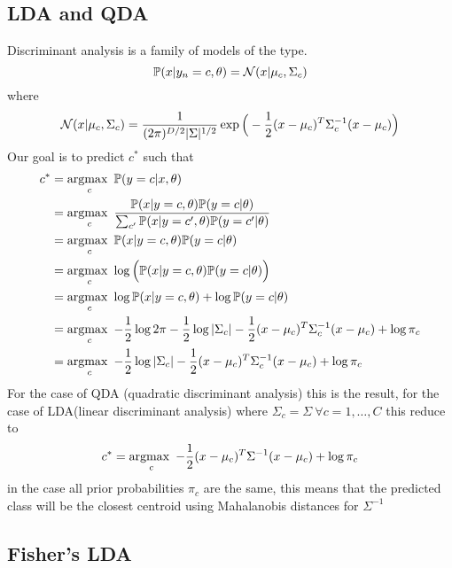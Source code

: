 \documentclass[../main.tex]{subfiles}
\begin{document}
\subsection{LDA and QDA}
Discriminant analysis is a family of models of the type.
\begin{equation*}
    \mathbb{P}(x | y_n=c, \theta) = \mathcal{N}(x|\mu_c, \Sigma_c)
\end{equation*}
where
\begin{equation*}
    \mathcal{N}(x|\mu_c, \Sigma_c) = \dfrac{1}{(2\pi)^{D/2} |\Sigma|^{1/2}} \exp\Big(-\frac{1}{2} (x-\mu_c)^T \Sigma_c^{-1} (x-\mu_c)\Big)
\end{equation*}
Our goal is to predict $c^*$ such that
\begin{align*}
    c^*
    &= \operatorname*{argmax\text{ }}_c \mathbb{P}(y=c|x,\theta)\\
    &= \operatorname*{argmax\text{ }}_c \dfrac{\mathbb{P}(x|y=c,\theta)\mathbb{P}(y=c|\theta)}{\sum_{c'}\mathbb{P}(x|y=c',\theta)\mathbb{P}(y=c'|\theta)}\\
    &= \operatorname*{argmax\text{ }}_c \mathbb{P}(x|y=c,\theta)\mathbb{P}(y=c|\theta)\\
    &= \operatorname*{argmax\text{ }}_c \log\Big(\mathbb{P}(x|y=c,\theta)\mathbb{P}(y=c|\theta)\Big)\\
    &= \operatorname*{argmax\text{ }}_c \log\mathbb{P}(x|y=c,\theta) + \log\mathbb{P}(y=c|\theta)\\
    &= \operatorname*{argmax\text{ }}_c -\frac{1}{2}\log2\pi -\frac{1}{2}\log|\Sigma_c| -\frac{1}{2} (x-\mu_c)^T \Sigma_c^{-1} (x-\mu_c) + \log\pi_c\\
    &= \operatorname*{argmax\text{ }}_c -\frac{1}{2}\log|\Sigma_c| -\frac{1}{2} (x-\mu_c)^T \Sigma_c^{-1} (x-\mu_c) + \log\pi_c\\
\end{align*}
For the case of QDA (quadratic discriminant analysis) this is the result, for the case of LDA(linear discriminant analysis) where $\Sigma_c = \Sigma\ \forall c=1,\dots,C$ this reduce to
\begin{align*}
    c^*
    &= \operatorname*{argmax\text{ }}_c -\frac{1}{2} (x-\mu_c)^T \Sigma^{-1} (x-\mu_c) + \log\pi_c\\
\end{align*}
in the case all prior probabilities $\pi_c$ are the same, this means that the predicted class will be the closest centroid using Mahalanobis distances for $\Sigma^{-1}$

\subsection{Fisher's LDA}
\end{document}
